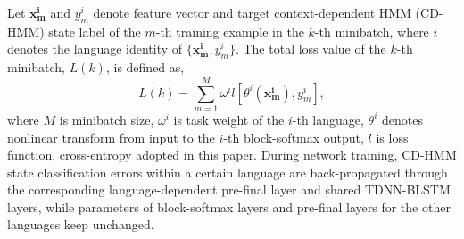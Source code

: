 \documentclass[a4paper]{article}
\begin{document}
Let $\bm{x_{m}^{i}}$ and $y_{m}^{i}$ denote feature vector and target context-dependent HMM (CD-HMM) state label of the $m$-th training example in the $k$-th minibatch, where $i$ denotes the language identity of $\{\bm{x_{m}^{i}}, y_{m}^{i}\}$.
The total loss value of the $k$-th minibatch, $L(k)$, is defined as,
\begin{equation}
L(k)=\sum_{m=1}^{M} \omega^{i} l[\theta^{i}(\bm{x_{m}^{i}}), y_{m}^{i}],
\end{equation}
where $M$ is minibatch size, $\omega^{i}$ is task weight of the $i$-th language,
$\theta^{i}$ denotes nonlinear transform from input to the $i$-th block-softmax output, $l$ is loss function, cross-entropy \cite{vesely2013sequence} adopted in this paper. During network training, CD-HMM state classification errors within a certain language are back-propagated through the corresponding language-dependent pre-final layer and shared TDNN-BLSTM layers, while parameters of block-softmax layers and pre-final layers for the other languages keep unchanged.
\end{document}
